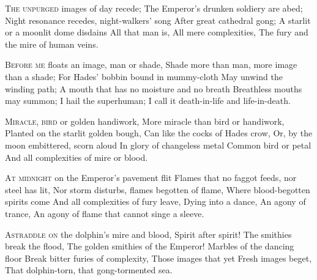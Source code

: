 \documentclass[fontsize=9, a5paper]{scrbook}
\begin{document}
\begin{poem}
	\begin{stanza}
		\textsc{The unpurged} images of day recede;\verseline
		The Emperor's drunken soldiery are abed;\verseline
		Night resonance recedes, night-walkers' song\verseline
		After great cathedral gong;\verseline
		A starlit or a moonlit dome disdains\verseline
		All that man is,\verseline
		All mere complexities,\verseline
		The fury and the mire of human veins.
	\end{stanza}
	
	\begin{stanza}
		\textsc{Before me} floats an image, man or shade,\verseline
		Shade more than man, more image than a shade;\verseline
		For Hades' bobbin bound in mummy-cloth\verseline
		May unwind the winding path;\verseline
		A mouth that has no moisture and no breath\verseline
		Breathless mouths may summon;\verseline
		I hail the superhuman;\verseline
		I call it death-in-life and life-in-death.
	\end{stanza}
	
	\pagebreak

	\begin{stanza}
		\textsc{Miracle, bird} or golden handiwork,\verseline
		More miracle than bird or handiwork,\verseline
		Planted on the starlit golden bough,\verseline
		Can like the cocks of Hades crow,\verseline
		Or, by the moon embittered, scorn aloud\verseline
		In glory of changeless metal\verseline
		Common bird or petal\verseline
		And all complexities of mire or blood.
	\end{stanza}
	
	\begin{stanza}
		\textsc{At midnight} on the Emperor's pavement flit\verseline
		Flames that no faggot feeds, nor steel has lit,\verseline
		Nor storm disturbs, flames begotten of flame,\verseline
		Where blood-begotten spirits come\verseline
		And all complexities of fury leave,\verseline
		Dying into a dance,\verseline
		An agony of trance,\verseline
		An agony of flame that cannot singe a sleeve.
	\end{stanza}
	
	\begin{stanza}
		\textsc{Astraddle on} the dolphin's mire and blood,\verseline
		Spirit after spirit! The smithies break the flood,\verseline
		The golden smithies of the Emperor!\verseline
		Marbles of the dancing floor\verseline
		Break bitter furies of complexity,\verseline
		Those images that yet\verseline
		Fresh images beget,\verseline
		That dolphin-torn, that gong-tormented sea.
	\end{stanza}
\end{poem}
\end{document}
